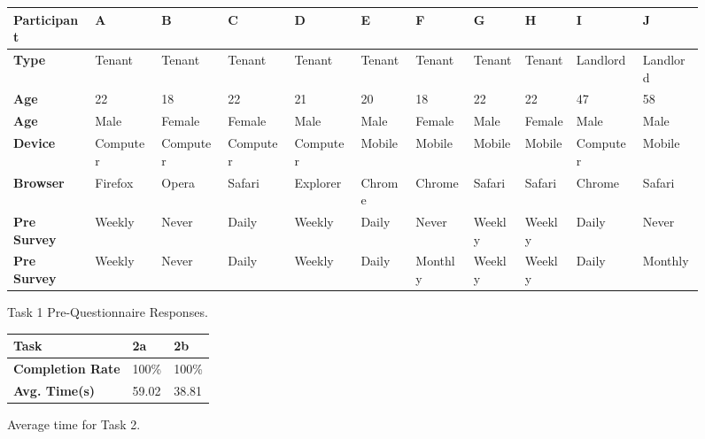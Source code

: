 \documentclass[12pt]{article}
\begin{document}
\begin{figure}[h]
    \begin{tiny}
        \renewcommand*{\arraystretch}{1.4}
        \begin{longtable}{|L{1.5cm}|L{1.15cm}|L{1.15cm}|L{1.15cm}|L{1.15cm}|L{1cm}|L{1cm}|L{1cm}|L{1cm}|L{1.15cm}|L{1.1cm}|}
            \hline
            \textbf{Participant} & \textbf{A} & \textbf{B} & \textbf{C} & \textbf{D} & \textbf{E} & \textbf{F} & \textbf{G} & \textbf{H} & \textbf{I} & \textbf{J}\\
            \hline
            \textbf{Type} & Tenant & Tenant & Tenant & Tenant & Tenant & Tenant & Tenant & Tenant & Landlord & Landlord \\
            \hline
            \textbf{Age} & 22 & 18 & 22 & 21 & 20 & 18 & 22 & 22 & 47 & 58 \\
            \hline
            \textbf{Age} & Male & Female & Female & Male & Male & Female & Male & Female & Male & Male \\
            \hline
            \textbf{Device} & Computer & Computer & Computer & Computer & Mobile & Mobile & Mobile & Mobile & Computer & Mobile \\
            \hline
            \textbf{Browser} & Firefox & Opera & Safari & Explorer & Chrome & Chrome & Safari & Safari & Chrome & Safari \\
            \hline
            \textbf{Pre Survey} & Weekly & Never & Daily & Weekly & Daily & Never & Weekly & Weekly & Daily & Never \\
            \hline
            \textbf{Pre Survey} & Weekly & Never & Daily & Weekly & Daily & Monthly & Weekly & Weekly & Daily & Monthly \\
            \hline
        \end{longtable}
    \end{tiny}
    \caption{Task 1 Pre-Questionnaire Responses.}
    \label{fig:participants}
\end{figure}


\begin{figure}[h]
    \begin{longtable}{|L{5cm}|L{5cm}|L{5cm}|}
        \hline
        \textbf{Task} & 2a & 2b \\
        \hline
        \textbf{Completion Rate} & 100\% & 100\% \\
        \hline
        \textbf{Avg. Time(s)} & 59.02 & 38.81 \\
        \hline
    \end{longtable}
    \caption{Average time for Task 2.}
    \label{fig:task2}
\end{figure}
\end{document}
